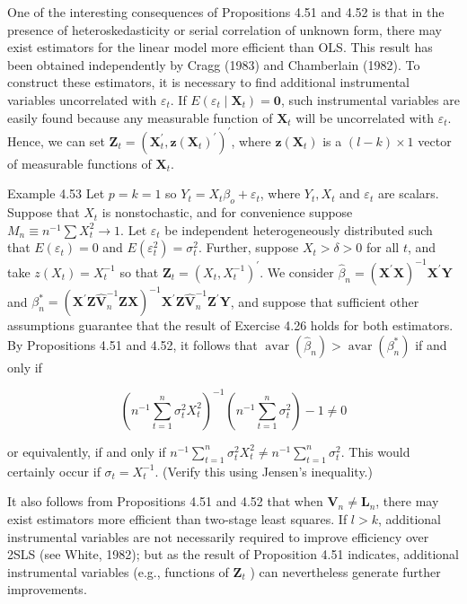 \documentclass[10pt]{article}
\begin{document}
One of the interesting consequences of Propositions 4.51 and 4.52 is that in the presence of heteroskedasticity or serial correlation of unknown form, there may exist estimators for the linear model more efficient than OLS. This result has been obtained independently by Cragg (1983) and Chamberlain (1982). To construct these estimators, it is necessary to find additional instrumental variables uncorrelated with $\varepsilon_{t}$. If $E\left(\varepsilon_{t} \mid \mathbf{X}_{t}\right)=\mathbf{0}$, such instrumental variables are easily found because any measurable function of $\mathbf{X}_{t}$ will be uncorrelated with $\varepsilon_{t}$. Hence, we can set $\mathbf{Z}_{t}=\left(\mathbf{X}_{t}^{\prime}, \mathbf{z}\left(\mathbf{X}_{t}\right)^{\prime}\right)^{\prime}$, where $\mathbf{z}\left(\mathbf{X}_{t}\right)$ is a $(l-k) \times 1$ vector of measurable functions of $\mathbf{X}_{t}$.

Example 4.53 Let $p=k=1$ so $Y_{t}=X_{t} \beta_{o}+\varepsilon_{t}$, where $Y_{t}, X_{t}$ and $\varepsilon_{t}$ are scalars. Suppose that $X_{t}$ is nonstochastic, and for convenience suppose $M_{n} \equiv n^{-1} \sum X_{t}^{2} \rightarrow 1$. Let $\varepsilon_{t}$ be independent heterogeneously distributed such that $E\left(\varepsilon_{t}\right)=0$ and $E\left(\varepsilon_{t}^{2}\right)=\sigma_{t}^{2}$. Further, suppose $X_{t}>\delta>0$ for all $t$, and take $z\left(X_{t}\right)=X_{t}^{-1}$ so that $\mathbf{Z}_{t}=\left(X_{t}, X_{t}^{-1}\right)^{\prime}$. We consider $\hat{\beta}_{n}=\left(\mathbf{X}^{\prime} \mathbf{X}\right)^{-1} \mathbf{X}^{\prime} \mathbf{Y}$ and $\beta_{n}^{*}=\left(\mathbf{X}^{\prime} \mathbf{Z} \hat{\mathbf{V}}_{n}^{-1} \mathbf{Z X}\right)^{-1} \mathbf{X}^{\prime} \mathbf{Z} \hat{\mathbf{V}}_{n}^{-1} \mathbf{Z}^{\prime} \mathbf{Y}$, and suppose that sufficient other assumptions guarantee that the result of Exercise 4.26 holds for both estimators. By Propositions 4.51 and 4.52, it follows that $\operatorname{avar}\left(\hat{\beta}_{n}\right)>\operatorname{avar}\left(\beta_{n}^{*}\right)$ if and only if

$$
\left(n^{-1} \sum_{t=1}^{n} \sigma_{t}^{2} X_{t}^{2}\right)^{-1}\left(n^{-1} \sum_{t=1}^{n} \sigma_{t}^{2}\right)-1 \neq 0
$$

or equivalently, if and only if $n^{-1} \sum_{t=1}^{n} \sigma_{t}^{2} X_{t}^{2} \neq n^{-1} \sum_{t=1}^{n} \sigma_{t}^{2}$. This would certainly occur if $\sigma_{t}=X_{t}^{-1}$. (Verify this using Jensen's inequality.)

It also follows from Propositions 4.51 and 4.52 that when $\mathbf{V}_{n} \neq \mathbf{L}_{n}$, there may exist estimators more efficient than two-stage least squares. If $l>k$, additional instrumental variables are not necessarily required to improve efficiency over 2SLS (see White, 1982); but as the result of Proposition 4.51 indicates, additional instrumental variables (e.g., functions of $\mathbf{Z}_{t}$ ) can nevertheless generate further improvements.
\end{document}
